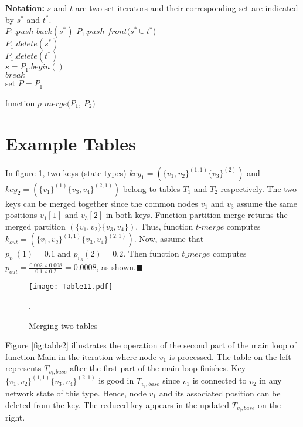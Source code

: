 \begin{algorithm}[htpd]
\textbf{Notation:} $s$ and $t$ are two set iterators and their corresponding set are indicated by $s^*$ and $t^*$.\\ 
\nl {}
{
\nl $P_1.push\_back(s^*)$
}
\nl {}
{
\nl {}
{
 \nl {}
  {
\nl  	$  P_1.push\_front(s^*\cup t^*$) \\
\nl$P_1.delete(s^*)$\\
  \nl $P_1.delete(t^*)$\\
  \nl $s=P_1.begin()$\\
   \nl$break$\\
  }
}
}
\nl set $P=P_1$\\
\caption{function $p\_merge(P_1$, $P_2)$}
\label{ch3:fmpar}
\end{algorithm}

\section{Example Tables}
\begin{example}
\normalfont
In figure \ref{fig:table1}, two keys (state types)
$key_1=(\{v_1,v_2\}^{(1,1)}\{v_3\}^{(2)})$  and $key_2=(\{v_1\}^{(1)}\{v_3,v_4\}^{(2,1)})$ belong to tables $T_1$ and $T_2$ respectively. The two keys can be merged together since the common nodes $v_1$ and $v_3$ assume the same positions $v_1[1] \mbox{ and } v_3[2]$ in both keys. Function partition merge returns the merged partition $(\{v_1,v_2\}\{v_3,v_4\})$. Thus, function $t\mbox{-}merge$ computes $k_{out}=(\{v_1,v_2\}^{(1,1)}\{v_3,v_4\}^{(2,1)})$. Now, assume that $p_{v_1}(1)=0.1 \mbox{ and }p_{v_3}(2)=0.2$. Then function $t\_merge$ computes $p_{out}= \frac{0.002\times 0.008}{0.1\times 0.2}=0.0008$, as shown.$\blacksquare$
\end{example}

\begin{figure}[!htb]
\centering
\texttt{[image: Table11.pdf]}
 \caption{ Merging two tables}.
 \label{fig:table1}
\end{figure}

\begin{example}
\normalfont
Figure \ref{fig:table2} illustrates the operation of the second part of the main loop of function Main in the iteration where node $v_1$ is processed. The table on the left represents $T_{v_i,base}$ after the first part of the main loop finishes. Key $\{v_1,v_2\}^{(1,1)}\{v_3,v_4\}^{(2,1)}$ is good in $T_{v_i,base}$ since $v_1$ is connected to $v_2$ in any network state of this type. Hence, node $v_1$ and its associated position can be deleted from the key. The reduced key appears in the updated $T_{v_i,base}$ on the right.
\end{example}

